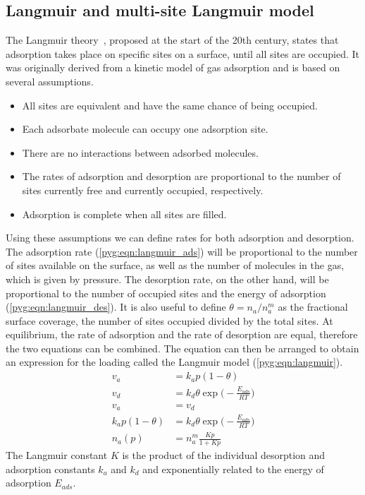 \subsection{Langmuir and multi-site Langmuir
	model}\label{pyg:models:langmuir}

The Langmuir theory~\cite{langmuirAdsorptionGasesPlane1918},
proposed at the start of the 20th century, states that
adsorption takes place on specific sites on a surface, until
all sites are occupied.
It was originally derived from a kinetic model of gas adsorption and
is based on several assumptions.

\begin{itemize}

	\item All sites are equivalent and have the same chance of
	      being occupied.
	\item Each adsorbate molecule can occupy one adsorption site.
	\item There are no interactions between adsorbed molecules.
	\item The rates of adsorption and desorption are proportional
	      to the number of sites currently free and currently occupied,
	      respectively.
	\item Adsorption is complete when all sites are filled.

\end{itemize}

Using these assumptions we can define rates for both adsorption and
desorption. The adsorption rate (\autoref{pyg:eqn:langmuir_ads})
will be proportional to the number of sites available on the surface,
as well as the number of molecules in the gas, which is given by
pressure.
The desorption rate, on the other hand, will be proportional to the
number of occupied sites and the energy of adsorption
(\autoref{pyg:eqn:langmuir_des}).
It is also useful to define \(\theta = n_a/n_a^m\) as the fractional
surface coverage, the number of sites occupied divided by the total 
sites. At equilibrium, the rate of adsorption and the rate of
desorption are equal, therefore the two equations can be combined.
The equation can then be arranged to obtain an expression for the
loading called the Langmuir model (\autoref{pyg:eqn:langmuir}).
%
\begin{align}
	v_a                & = k_a p (1 - \theta) \label{pyg:eqn:langmuir_ads} \\
	v_d                & = k_d \theta \exp{\Big(-\frac{E_{ads}}{RT}\Big)}
	\label{pyg:eqn:langmuir_des}                                           \\
	v_a                & = v_d                                             \\
	k_a p (1 - \theta) & = k_d \theta \exp{\Big(-\frac{E_{ads}}{RT}\Big)}  \\
	n_a(p)             & = n_a^m \frac{Kp}{1+Kp} \label{pyg:eqn:langmuir}
\end{align}
%
The Langmuir constant \(K\) is the product of the individual
desorption and adsorption constants \(k_a\) and \(k_d\) and exponentially
related to the energy of adsorption \(E_{ads}\).

